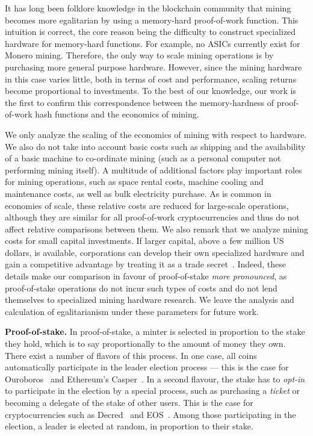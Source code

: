 It has long been folklore knowledge in the blockchain community that mining
becomes more egalitarian by using a memory-hard proof-of-work function. This
intuition is correct, the core reason being the difficulty to construct
specialized hardware for memory-hard functions. For example, no ASICs
currently exist for Monero mining.  Therefore, the only way to scale mining
operations is by purchasing more general purpose hardware. However, since the mining hardware
in this case varies little, both in terms of cost and performance, scaling
returns become proportional to investments.  To the best of our knowledge, our
work is the first to confirm this correspondence between the
memory-hardness of proof-of-work hash functions and the economics of mining.

\begin{remark}\label{rmk:pow-scale}
We only analyze the scaling of the economics of mining with
respect to hardware. We also do not take into account basic costs such as
shipping and the availability of a basic machine to co-ordinate mining (such as
a personal computer not performing mining itself). A multitude of additional
factors play important roles for mining operations, such as space rental costs,
machine cooling and maintenance costs, as well as bulk electricity purchase.  As
is common in economies of scale, these relative costs are reduced for
large-scale operations, although they are similar for all proof-of-work
cryptocurrencies and thus do not affect relative comparisons between them. We
also remark that we analyze mining costs for small capital investments. If
larger capital, \eg above a few million US dollars, is available, corporations
can develop their own specialized hardware and gain a competitive advantage by
treating it as a trade secret~\cite{taylor2013bitcoin}. Indeed, these details
make our comparison in favour of proof-of-stake \emph{more pronounced}, as
proof-of-stake operations do not incur such types of costs and do not lend
themselves to specialized mining hardware research. We leave the analysis and
calculation of egalitarianism under these parameters for future work.
\end{remark}

\noindent\textbf{Proof-of-stake.}
In proof-of-stake, a minter is selected in proportion to the stake they hold,
which is to say proportionally to the amount of money they own. There exist a
number of flavors of this process. In one case, all coins automatically
participate in the leader election process --- this is the case for Ouroboros~\cite{C:KRDO17} and
Ethereum's Casper~\cite{buterin2017casper}. In a second flavour, the stake has
to \emph{opt-in} to participate in the election by a special process, such as
purchasing a \emph{ticket} or becoming a delegate of the stake of other users.
This is the case for cryptocurrencies such as Decred~\cite{decred} and EOS~\cite{eos}. Among those
participating in the election, a leader is elected at random, in proportion to
their stake.

